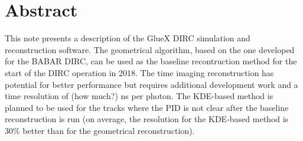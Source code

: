 \section*{Abstract}

This note presents a description of the GlueX DIRC simulation and reconstruction software. The geometrical algorithm, based on the one developed for the BABAR DIRC, can be used as the baseline recontruction method for the start of the DIRC operation in 2018. The time imaging reconstruction has potential for better performance but requires additional development work and a time resolution of (how much?) ns per photon. The KDE-based method is planned to be used for the tracks where the PID is not clear after the baseline reconstruction is run (on average, the resolution for the KDE-based method is 30{\%} better than for the geometrical reconstruction).

